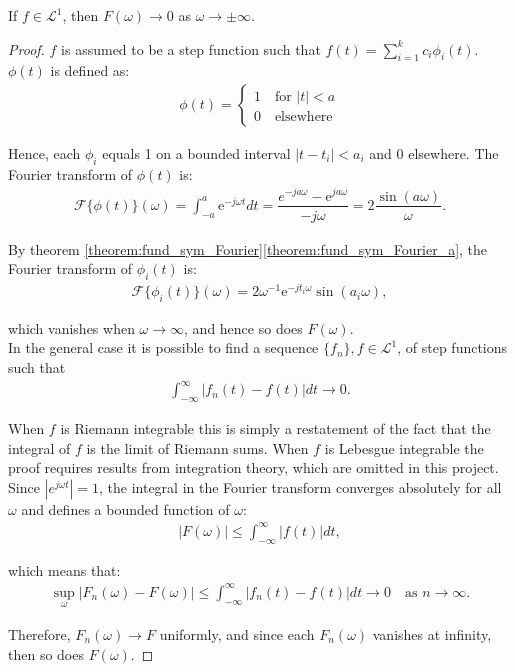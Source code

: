 \begin{theorem}
If $f \in \mathcal{L}^1$, then $F(\omega) \to 0$ as $\omega \to \pm \infty$.
\end{theorem}

\begin{proof}
$f$ is assumed to be a step function such that $f(t) = \sum_{i=1}^k c_i \phi_i(t)$. $\phi(t)$ is defined as:
\begin{align*}
\phi(t) =
	\begin{cases}
		1 \quad \text{for } |t| < a \\
		0 \quad \text{elsewhere}
	\end{cases}
\end{align*}

Hence, each $\phi_i$ equals 1 on a bounded interval $|t - t_i| < a_i$ and 0 elsewhere. The Fourier transform of $\phi(t)$ is:
\begin{align*}
\mathcal{F}\{\phi(t)\}(\omega) = \int_{-a}^a \text{e}^{-j\omega t} dt = \dfrac{e^{-ja\omega} - \text{e}^{ja\omega}}{-j\omega} = 2\dfrac{\sin(a\omega)}{\omega}.
\end{align*}

By theorem \ref{theorem:fund_sym_Fourier}\ref{theorem:fund_sym_Fourier_a}, the Fourier transform of $\phi_i(t)$ is:
\begin{align*}
\mathcal{F}\{\phi_i(t)\}(\omega) = 2 \omega^{-1} \text{e}^{-jt_i\omega} \sin(a_i\omega),
\end{align*}

which vanishes when $\omega \to \infty$, and hence so does $F(\omega)$.
\\
In the general case it is possible to find a sequence $\{f_n\}, f \in \mathcal{L}^1$, of step functions such that
\begin{align*}
\int_{-\infty}^\infty |f_n(t) - f(t)| dt \to 0.
\end{align*}

When $f$ is Riemann integrable this is simply a restatement of the fact that the integral of $f$ is the limit of Riemann sums. When $f$ is Lebesgue integrable the proof requires results from integration theory, which are omitted in this project. Since $|e^{j\omega t}| = 1$, the integral in the Fourier transform converges absolutely for all $\omega$ and defines a bounded function of $\omega$:
\begin{align*}
|F(\omega)| \leq \int_{-\infty}^\infty |f(t)| dt,
\end{align*}

which means that:
\begin{align*}
\sup_{\omega} |F_n(\omega) - F(\omega)| \leq \int_{-\infty}^\infty |f_n(t) - f(t)| dt \to 0 \quad \text{as } n \to \infty.
\end{align*}

Therefore, $F_n(\omega) \to F$ uniformly, and since each $F_n(\omega)$ vanishes at infinity, then so does $F(\omega)$.
\end{proof}

